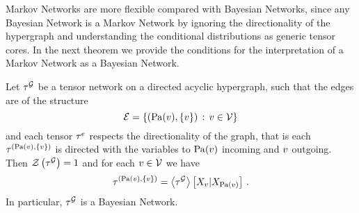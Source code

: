 
Markov Networks are more flexible compared with Bayesian Networks, since any Bayesian Network is a Markov Network by ignoring the directionality of the hypergraph and understanding the conditional distributions as generic tensor cores.
In the next theorem we provide the conditions for the interpretation of a Markov Network as a Bayesian Network.

\begin{theorem}
    \label{the:MarkovToBayesian}
    Let $\tau^{\mathcal{G}}$ be a tensor network on a directed acyclic hypergraph, such that the edges are of the structure
    \[ \mathcal{E} = \{(\mathrm{Pa}(v),\{v\}) \, : \, v\in\mathcal{V}\} \]
    and each tensor $\tau^{e}$ respects the directionality of the graph, that is each $\tau^{(\mathrm{Pa}(v), \{v\})}$ is directed with the variables to $\mathrm{Pa}(v)$ incoming and $v$ outgoing.
    Then $\mathcal{Z}\left(\tau^{\mathcal{G}}\right)=1$ and for each $v\in\mathcal{V}$ we have
    \[ \tau^{(\mathrm{Pa}(v),\{v\})} = \left\langle \tau^{\mathcal{G}}\right\rangle \left[ X_{v} | X_{\mathrm{Pa}(v)} \right] \, . \]
    In particular, $\tau^{\mathcal{G}}$ is a Bayesian Network.
\end{theorem}
